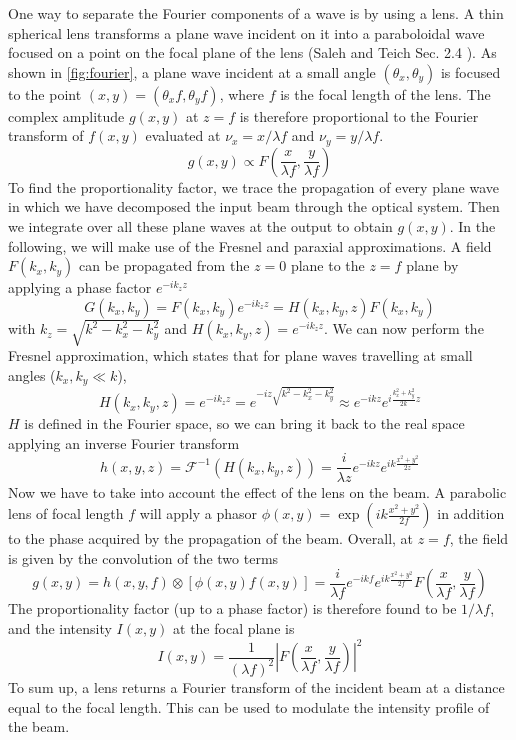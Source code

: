 One way to separate the Fourier components of a wave is by using a lens. A thin spherical lens transforms a plane wave incident on it into a paraboloidal wave focused on a point on the focal plane of the lens (Saleh and Teich Sec. 2.4 \cite{saleh1991}). As shown in \cref{fig:fourier}, a plane wave incident at a small angle $(\theta_x, \theta_y)$ is focused to the point $(x,y) = (\theta_x f, \theta_y f)$, where $f$ is the focal length of the lens. The complex amplitude $g(x,y)$ at $z=f$ is therefore proportional to the Fourier transform of $f(x,y)$ evaluated at $\nu_x = x / \lambda f$ and $\nu_y = y / \lambda f$.
\begin{equation}
    g(x,y) \propto F\left(\frac{x}{\lambda f}, \frac{y}{\lambda f}\right)
\end{equation}
To find the proportionality factor, we trace the propagation of every plane wave in which we have decomposed the input beam through the optical system. Then we integrate over all these plane waves at the output to obtain $g(x,y)$. In the following, we will make use of the Fresnel and paraxial approximations.
A field $F(k_x,k_y)$ can be propagated from the $z=0$ plane to the $z=f$ plane by applying a phase factor $e^{-ik_zz}$
\begin{equation}
    G(k_x, k_y) = F(k_x,k_y) e^{-ik_zz} = H(k_x, k_y, z) F(k_x, k_y)
\end{equation}
with $k_z = \sqrt{k^2 - k_x^2 - k_y^2}$ and  $H(k_x, k_y, z) = e^{-ik_zz}$. We can now perform the Fresnel approximation, which states that for plane waves travelling at small angles ($k_x, k_y \ll k$),
\begin{equation}
    H(k_x, k_y, z) = e^{-ik_zz} = e^{-iz\sqrt{k^2 - k_x^2 - k_y^2}} \approx e^{-ikz}e^{i\frac{k_x^2 + k_y^2}{2k}z}
\end{equation}
$H$ is defined in the Fourier space, so we can bring it back to the real space applying an inverse Fourier transform
\begin{equation}
    h(x,y,z) = \mathcal{F}^{-1}(H(k_x, k_y, z)) = \frac{i}{\lambda z} e^{-ikz} e^{ik\frac{x^2+y^2}{2z}}
\end{equation}
Now we have to take into account the effect of the lens on the beam. A parabolic lens of focal length $f$ will apply a phasor $\phi(x,y) = \exp(ik\frac{x^2+y^2}{2f})$ in addition to the phase acquired by the propagation of the beam. Overall, at $z=f$, the field is given by the convolution of the two terms
\begin{equation}
    g(x,y) = h(x,y,f) \otimes \left[ \phi(x,y) f(x,y) \right]
    = \frac{i}{\lambda f} e^{-ikf} e^{ik \frac{x^2+y^2}{2f}} F\left(\frac{x}{\lambda f}, \frac{y}{\lambda f}\right)
\end{equation}
The proportionality factor (up to a phase factor) is therefore found to be $1/\lambda f$,
and the intensity $I(x,y)$ at the focal plane is
\begin{equation}
    I(x,y) = \frac{1}{(\lambda f)^2} \left| F \left(\frac{x}{\lambda f}, \frac{y}{\lambda f}\right) \right|^2
\end{equation}
To sum up, a lens returns a Fourier transform of the incident beam at a distance equal to the focal length. This can be used to modulate the intensity profile of the beam.

